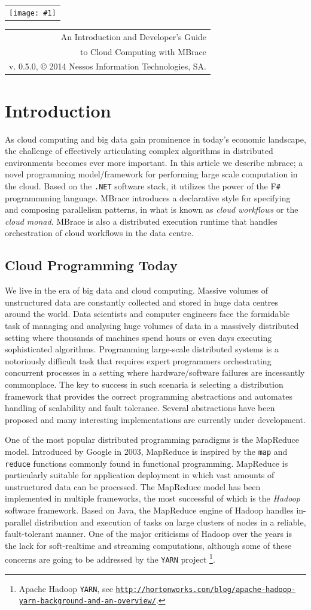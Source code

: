\documentclass[9pt,a4paper]{article}
\makeatletter
\newcommand{\version}{0.5.0}
\newcommand{\showheader}[1]{%
%
\begin{center}
\begin{tabular}{@{} l}
\texttt{[image: \#1]}
\end{tabular}%
%
\hspace{3em}
%
\begin{tabular}{ @{\hspace{\stretch{5}}} r }
{\huge An Introduction and Developer's Guide}\\[1.2em]
{\huge to Cloud Computing with \TitularMbrace}\\[3em]
{{v\mbox{.} \version},\hspace{1em}%
\copyright{} 2014 Nessos Information Technologies, SA.}
\end{tabular}%
\end{center}%
}
\newcommand{\mbrace}{mbrace}
\newcommand{\Mbrace}{MBrace}
\newcommand{\TitularMbrace}{MBrace}
\newcommand{\fsharp}{F\texttt \#}
\newcommand{\dotnet}{\texttt{\hbox{.}NET}}
\newcommand{\samehref}[1]{\href{#1}{\texttt{#1}}}
\makeatother
\begin{document}
%
%
\showheader{mbrace.png}
%
%
\section{Introduction}%
%
As cloud computing and big data gain prominence in today's economic landscape,
the challenge of effectively articulating complex algorithms in distributed environments
becomes ever more important.
%
In this article we describe \mbrace; a novel programming model/framework for performing
large scale computation in the cloud. Based on the \dotnet{} software stack, it utilizes
the power of the \fsharp{} programmming language.
\Mbrace{} introduces a declarative style for specifying and composing parallelism patterns,
in what is known as \emph{cloud workflows} or the \emph{cloud monad}.
\Mbrace{} is also a distributed execution runtime that handles orchestration of cloud 
workflows in the data centre.
%
\subsection{Cloud Programming Today}
%
We live in the era of big data and cloud computing. Massive volumes of unstructured 
data are constantly collected and stored in huge data centres around the world. 
Data scientists and computer engineers face the formidable task of managing and 
analysing huge volumes of data in a massively distributed setting where thousands of 
machines spend  hours or even days executing sophisticated algorithms.
Programming large-scale distributed systems is a notoriously difficult task
that requires expert programmers orchestrating concurrent processes in a setting
where hardware/\mbox{}software failures are incessantly commonplace.
The key to success in such scenaria is selecting a distribution framework that provides the
correct programming abstractions and automates handling of scalability and fault tolerance.
Several abstractions have been proposed and many interesting implementations are
currently under development.

One of the most popular distributed programming paradigms is the
MapReduce model. Introduced by Google\cite{map-reduce} in 2003, MapReduce is inspired by the \texttt{map}
and \texttt{reduce} functions commonly found in functional programming. MapReduce is
particularly suitable for application deployment in which vast amounts of unstructured
data can be processed. The MapReduce model has been implemented in multiple frameworks,
the most successful of which is the \emph{Hadoop} software framework.
Based on Java, the MapReduce engine of Hadoop handles in-parallel 
distribution and execution of tasks on large clusters of nodes in a reliable, 
fault-tolerant manner.  One of the major criticisms of Hadoop over the years is the 
lack for soft-realtime and streaming computations, although some of these concerns are 
going to be addressed by the \texttt{YARN} project%
\footnote{Apache Hadoop \texttt{YARN},
see \samehref{http://hortonworks.com/blog/apache-hadoop-yarn-background-and-an-overview/}.}. 
\end{document}

